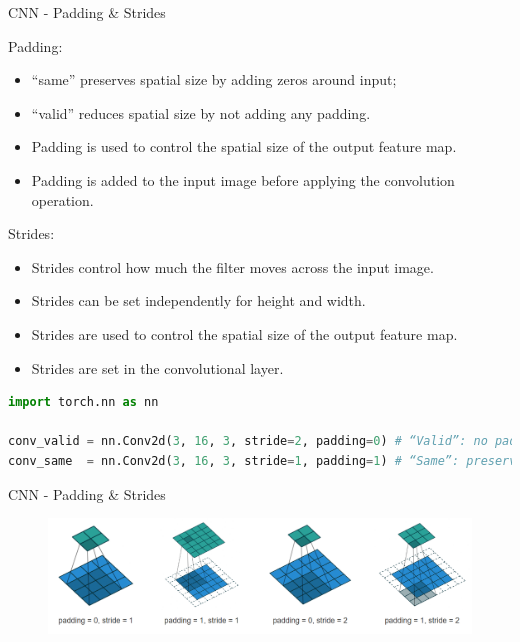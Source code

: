 \begin{frame}[fragile]{CNN - Padding & Strides}
\begin{block}{Padding:}
    \begin{itemize}
        \item “same” preserves spatial size by adding zeros around input;
        \item “valid” reduces spatial size by not adding any padding.
        \item Padding is used to control the spatial size of the output feature map.
        \item Padding is added to the input image before applying the convolution operation.
    \end{itemize}
\end{block}

\begin{block}{Strides:}
    \begin{itemize}
        \item Strides control how much the filter moves across the input image.
        \item Strides can be set independently for height and width.
        \item Strides are used to control the spatial size of the output feature map.
        \item Strides are set in the convolutional layer.
    \end{itemize}
\end{block}

\begin{lstlisting}[language=Python, caption={Code snippet (PyTorch)}, basicstyle=\ttfamily\footnotesize]
import torch.nn as nn

conv_valid = nn.Conv2d(3, 16, 3, stride=2, padding=0) # “Valid”: no padding (padding=0)
conv_same  = nn.Conv2d(3, 16, 3, stride=1, padding=1) # “Same”: preserve size
\end{lstlisting}
\end{frame}  

\begin{frame}{CNN - Padding & Strides}
    \begin{figure}
    \centering
    \includegraphics[width=1\textwidth,height=1\textheight,keepaspectratio]{images/cnn/padding-stride.png}
    \end{figure}
\end{frame}